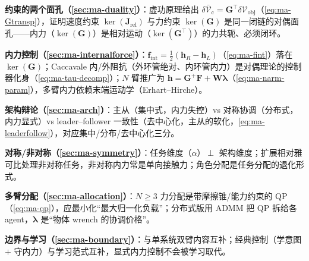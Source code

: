 \textbf{约束的两个面孔（\cref{sec:ma-duality}）}：虚功原理给出 $\delta\bar{\boldsymbol{\mathcal{V}}}_{\text{c}}=\mathbf{G}^\top\delta\boldsymbol{\mathcal{V}}_{\text{obj}}$（\cref{eq:ma-Gtransp}），证明速度约束 $\ker(\mathbf{J}_{\text{rel}})$ 与力约束 $\ker(\mathbf{G})$ 是同一闭链的对偶面孔——内力（$\ker(\mathbf{G})$）是相对运动（$\ker(\mathbf{G}^\top)$）的力共轭、必须闭环。

\textbf{内力控制（\cref{sec:ma-internalforce}）}：$\mathbf{f}_{\text{int}}=\tfrac12(\mathbf{h}_R-\mathbf{h}_L)$（\cref{eq:ma-fint}）落在 $\ker(\mathbf{G})$；Caccavale 内/外阻抗（外环管绝对、内环管内力）是对偶理论的控制器化身（\cref{eq:ma-tau-decomp}）；$N$ 臂推广为 $\mathbf{h}=\mathbf{G}^{+}\mathbf{F}+\mathbf{W}\boldsymbol{\lambda}$（\cref{eq:ma-narm-param}），多臂内力依赖末端运动学（Erhart--Hirche）。

\textbf{架构辩论（\cref{sec:ma-arch}）}：主从（集中式，内力失控）vs 对称协调（分布式，内力显式）vs leader--follower 一致性（去中心化，主从的软化，\cref{eq:ma-leaderfollow}），对应集中/分布/去中心化三分。

\textbf{对称/非对称（\cref{sec:ma-symmetry}）}：任务维度（$\alpha$）$\perp$ 架构维度；扩展相对雅可比处理非对称任务，非对称内力常是单向接触力；角色分配是任务分配的退化形式。

\textbf{多臂分配（\cref{sec:ma-allocation}）}：$N\ge3$ 力分配是带摩擦锥/能力约束的 QP（\cref{eq:ma-qp}），应最小化“最大归一化负载”；分布式版用 ADMM 把 QP 拆给各 agent，$\boldsymbol{\lambda}$ 是“物体 wrench 的协调价格”。

\textbf{边界与学习（\cref{sec:ma-boundary}）}：与单系统双臂内容互补；经典控制（学意图 $+$ 守内力）与学习范式互补，显式内力控制不会被学习取代。

